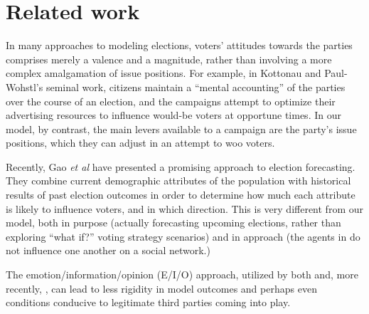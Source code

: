 \section{Related work}
\label{sec:related}


In many approaches to modeling elections, voters' attitudes towards the parties
comprises merely a valence and a magnitude, rather than involving a more
complex amalgamation of issue positions. For example, in Kottonau and
Paul-Wohstl's seminal work\cite{kottonau_simulating_2004}, citizens maintain
a ``mental accounting'' of the parties over the course of an election, and the
campaigns attempt to optimize their advertising resources to influence would-be
voters at opportune times. In our model, by contrast, the main levers available
to a campaign are the party's issue positions, which they can adjust in an
attempt to woo voters.

Recently, Gao \textit{et al}\cite{gao_forecasting_2022} have presented a
promising approach to election forecasting. They combine current demographic
attributes of the population with historical results of past election outcomes
in order to determine how much each attribute is likely to influence voters,
and in which direction. This is very different from our model, both in purpose
(actually forecasting upcoming elections, rather than exploring ``what if?''
voting strategy scenarios) and in approach (the agents in
\cite{gao_forecasting_2022} do not influence one another on a social network.)

The emotion/information/opinion (E/I/O) approach, utilized by both
\cite{sobkowicz_quantitative_2016} and, more recently,
\cite{burke_quantitatively_2022}, can lead to less rigidity in model outcomes
and perhaps even conditions conducive to legitimate third parties coming into
play.

